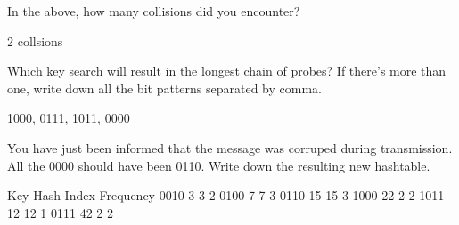 \nextq
In the above, how many collisions did you encounter?
\\
\ANSWER
\begin{answercode}
2 collsions
\end{answercode}

\nextq
Which key search will result in the longest chain of probes?
If there's more than one, write down all the bit patterns separated by
comma.
\\
\ANSWER
\begin{answercode}
1000, 0111, 1011, 0000
\end{answercode}

\nextq
You have just been informed that the message was corruped during
transmission.
All the 0000 should have been 0110.
Write down the resulting new hashtable.
\\
\ANSWER
\begin{answercode}
Key   Hash  Index  Frequency
0010  3     3      2
0100  7     7      3
0110  15    15     3
1000  22    2      2
1011  12    12     1
0111  42    2      2
\end{answercode}


